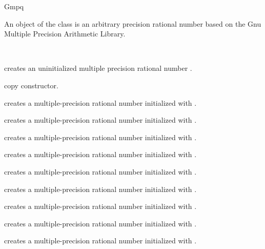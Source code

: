 \begin{ccRefClass} {Gmpq}
\label{Gmpq}

\ccDefinition

An object of the class  is an arbitrary precision rational
number based on the {\sc Gnu} Multiple Precision Arithmetic Library. 


\ccIsModel
{}\\

\ccTypes


\ccCreation
{}

             {creates an uninitialized multiple precision rational number \ccVar.}

\ccHidden {}
            {copy constructor.}

            {creates a multiple-precision rational number initialized with
             .}

            {creates a multiple-precision rational number initialized with
             .}

            {creates a multiple-precision rational number initialized with
             .}

            {creates a multiple-precision rational number initialized with
             .}

            {creates a multiple-precision rational number initialized with
             .}

            {creates a multiple-precision rational number initialized with
             .}

            {creates a multiple-precision rational number initialized with
             .}

            {creates a multiple-precision rational number initialized with
             .}

            {creates a multiple-precision rational number initialized with
             .}


\end{ccRefClass}
